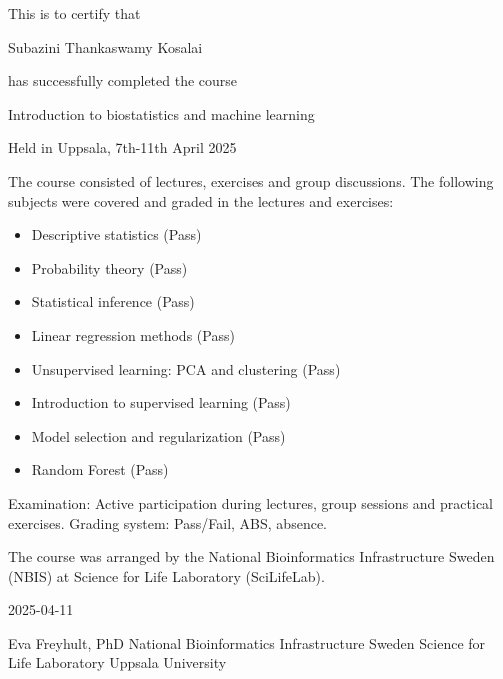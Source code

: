 \documentclass[12pt]{article}\usepackage[]{graphicx}\usepackage[]{color}
\newcommand{\courseName}{Introduction to biostatistics and machine learning}
\newcommand{\courseLocation}{in Uppsala}
\newcommand{\courseDate}{7th-11th April 2025}
\newcommand{\courseLastDay}{2025-04-11}
\newcommand{\courseExaminer}{Eva Freyhult, PhD}
\begin{document}
\large
This is to certify that 


\LARGE
Subazini Thankaswamy Kosalai

\large
has successfully completed the course \newline

\LARGE
\begin{center}{\courseName}  \end{center} 


\large
\begin{center} Held  {\courseLocation}, {\courseDate} \end{center} 

\vspace{5mm}
\normalsize
The course consisted of lectures, exercises and group discussions. The following subjects were covered and graded  in the lectures and exercises:
\begin{itemize}
  \item Descriptive statistics (Pass)
  \item Probability theory (Pass)
  \item Statistical inference (Pass)
  \item Linear regression methods (Pass)
  \item Unsupervised learning: PCA and clustering (Pass)
  \item Introduction to supervised learning (Pass)
  \item Model selection and regularization (Pass)
  \item Random Forest (Pass)
\end{itemize}


\vspace{5mm}
Examination: \newline
Active participation during lectures, group sessions and practical exercises. Grading system: Pass/Fail, ABS, absence. 

\vspace{8mm}
The course was arranged by the National Bioinformatics Infrastructure Sweden (NBIS) at Science for Life Laboratory (SciLifeLab).


\vspace{8mm}
 {\courseLastDay}
\vspace{22mm}


{\courseExaminer} \newline
\small
National Bioinformatics Infrastructure Sweden \newline
Science for Life Laboratory \newline
Uppsala University \newline
\end{document}

